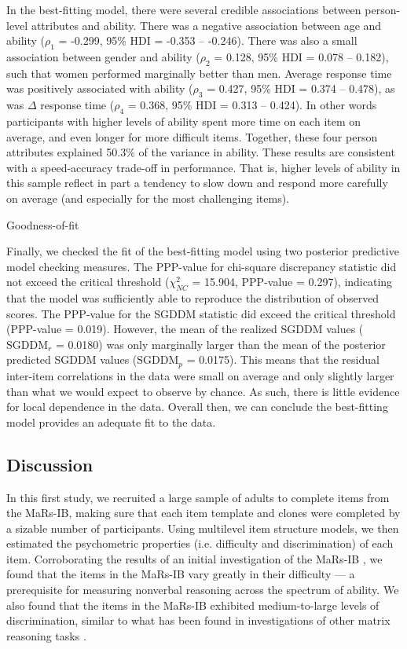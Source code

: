 \documentclass[a4paper,man,natbib]{apa6}
\makeatletter
\renewcommand{\subsubsection}{\@startsection{subsubsection}{3}
  {\z@}%
  {\b@level@two@skip}{\e@level@two@skip}%
  {\normalfont\normalsize\bfseries}}
\makeatother
\begin{document}
In the best-fitting model, there were several credible associations between person-level attributes and ability. There was a negative association between age and ability ($\rho_1$ = -0.299, 95\% HDI = -0.353 -- -0.246). There was also a small association between gender and ability ($\rho_2$ = 0.128, 95\% HDI = 0.078 -- 0.182), such that women performed marginally better than men. Average response time was positively associated with ability ($\rho_3$ = 0.427, 95\% HDI = 0.374 -- 0.478), as was $\Delta$ response time ($\rho_4$ = 0.368, 95\% HDI = 0.313 -- 0.424). In other words participants with higher levels of ability spent more time on each item on average, and even longer for more difficult items. Together, these four person attributes explained 50.3\% of the variance in ability. These results are consistent with a speed-accuracy trade-off in performance. That is, higher levels of ability in this sample reflect in part a tendency to slow down and respond more carefully on average (and especially for the most challenging items).  

\subsubsection{Goodness-of-fit}

Finally, we checked the fit of the best-fitting model using two posterior predictive model checking measures. The PPP-value for chi-square discrepancy statistic did not exceed the critical threshold ($\chi^2_{NC}$ = 15.904, PPP-value = 0.297), indicating that the model was sufficiently able to reproduce the distribution of observed scores. The PPP-value for the SGDDM statistic did exceed the critical threshold (PPP-value = 0.019). However, the mean of the realized SGDDM values ($\text{SGDDM}_r$ = 0.0180) was only marginally larger than the mean of the posterior predicted SGDDM values ($\text{SGDDM}_p$ = 0.0175). This means that the residual inter-item correlations in the data were small on average and only slightly larger than what we would expect to observe by chance. As such, there is little evidence for local dependence in the data. Overall then, we can conclude the best-fitting model provides an adequate fit to the data.

\subsection{Discussion}

In this first study, we recruited a large sample of adults to complete items from the MaRs-IB, making sure that each item template and clones were completed by a sizable number of participants. Using multilevel item structure models, we then estimated the psychometric properties (i.e. difficulty and discrimination) of each item. Corroborating the results of an initial investigation of the MaRs-IB \citep{chierchia2019matrix}, we found that the items in the MaRs-IB vary greatly in their difficulty --- a prerequisite for measuring nonverbal reasoning across the spectrum of ability. We also found that the items in the MaRs-IB exhibited medium-to-large levels of discrimination, similar to what has been found in investigations of other matrix reasoning tasks \citep{chiesi2012using, chiesi2012item, van2013shortened}.
\end{document}
